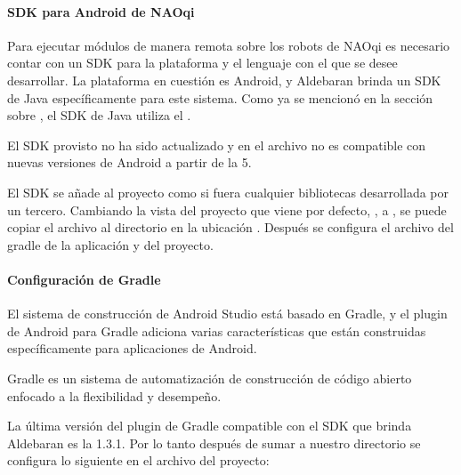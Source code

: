 \paragraph{SDK para Android de NAOqi}
\label{\detokenize{dev_docs:sdk-para-android-de-naoqi}}
Para ejecutar módulos de manera remota sobre los robots de NAOqi es necesario
contar con un SDK para la plataforma y el lenguaje con el que se desee
desarrollar. La plataforma en cuestión es Android, y Aldebaran brinda un SDK
de Java específicamente para este sistema. Como ya se mencionó en la sección
sobre , el SDK de Java utiliza el .

El SDK provisto  no ha sido actualizado y en el archivo  no es compatible
con nuevas versiones de Android a partir de la 5.

El SDK se añade al proyecto como si fuera cualquier bibliotecas desarrollada
por un tercero. Cambiando la vista del proyecto que viene por defecto, ,
a , se puede copiar el archivo 
al directorio en la ubicación . Después se configura el archivo
del gradle de la aplicación y del proyecto.


\paragraph{Configuración de Gradle}
\label{\detokenize{dev_docs:configuracion-de-gradle}}
El sistema de construcción de Android Studio está basado en Gradle, y el plugin
de Android para Gradle adiciona varias características que están
construidas específicamente para aplicaciones de Android.\\

\begin{remark}
Gradle es un sistema de automatización de construcción de código abierto
enfocado a la flexibilidad y desempeño.
\end{remark}

La última versión del plugin de Gradle compatible con el SDK que brinda
Aldebaran es la 1.3.1. Por lo tanto después de sumar a nuestro directorio
 se configura lo siguiente en el archivo  del
proyecto:

%
\begin{sphinxVerbatim}[commandchars=\\\{\}]
 
   
     
\end{sphinxVerbatim}

